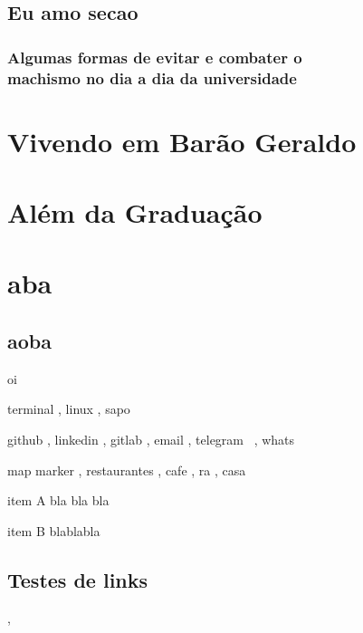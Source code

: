 \documentclass{book}
\begin{document}
\lipsum[1-5]

\section{Eu amo secao}
\setcounter{subsection}{3}
\subsection{Algumas formas de evitar e combater o \\ machismo no dia a dia da universidade}

\lipsum[1-5]

\chapter{Vivendo em Barão Geraldo}
\lipsum[1-5]

\chapter{Além da Graduação}
\lipsum[1-5]

\chapter{aba}
\section{aoba}
oi

terminal \faTerminal, linux \faLinux, sapo \faFrog

github \faGithub, linkedin \faLinkedin, gitlab \faGitlab, email \faEnvelope, telegram \faPaperPlane[regular] \faTelegram\ \faTelegramPlane, whats \faWhatsapp

map marker \faMapMarker*, restaurantes \faUtensils, cafe \faCoffee, ra \faIdCard[regular] \faAddressCard[regular], casa \faHome

\begin{list}{\faTerminal}{}  
\item item A bla bla bla
\item item B blablabla
\end{list}

\section{Testes de links}






\lipsum[1-5]

\begin{tags}
     \sep {}    
\end{tags}
\end{document}
